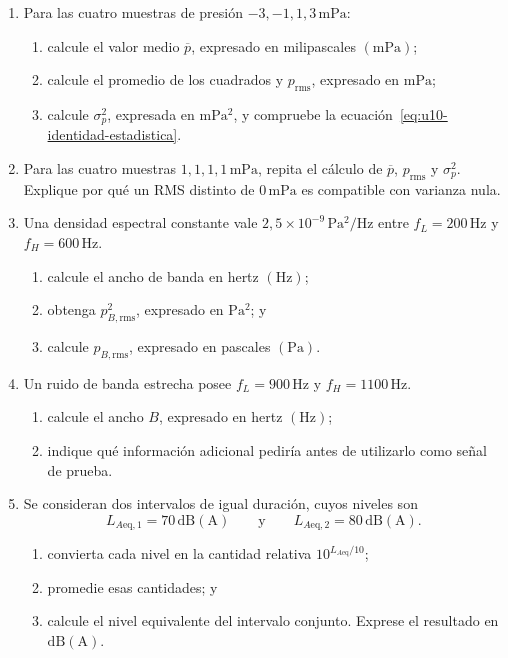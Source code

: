 \begin{enumerate}[label=\textbf{G\arabic*.},leftmargin=*]
    \item Para las cuatro muestras de presión
    \(-3,-1,1,3\,\mathrm{mPa}\):
    \begin{enumerate}
        \item calcule el valor medio \(\overline p\), expresado en
        milipascales \((\mathrm{mPa})\);
        \item calcule el promedio de los cuadrados y
        \(p_{\mathrm{rms}}\), expresado en \(\mathrm{mPa}\);
        \item calcule \(\sigma_p^2\), expresada en
        \(\mathrm{mPa^2}\), y compruebe la
        ecuación~\eqref{eq:u10-identidad-estadistica}.
    \end{enumerate}

    \item Para las cuatro muestras
    \(1,1,1,1\,\mathrm{mPa}\), repita el cálculo de
    \(\overline p\), \(p_{\mathrm{rms}}\) y \(\sigma_p^2\). Explique por qué
    un RMS distinto de \(0\,\mathrm{mPa}\) es compatible con varianza nula.

    \item Una densidad espectral constante vale
    \(2{,}5\times10^{-9}\,\mathrm{Pa^2/Hz}\) entre
    \(f_L=200\,\mathrm{Hz}\) y \(f_H=600\,\mathrm{Hz}\).
    \begin{enumerate}
        \item calcule el ancho de banda en hertz \((\mathrm{Hz})\);
        \item obtenga \(p_{B,\mathrm{rms}}^2\), expresado en
        \(\mathrm{Pa^2}\); y
        \item calcule \(p_{B,\mathrm{rms}}\), expresado en pascales
        \((\mathrm{Pa})\).
    \end{enumerate}

    \item Un ruido de banda estrecha posee
    \(f_L=900\,\mathrm{Hz}\) y \(f_H=1100\,\mathrm{Hz}\).
    \begin{enumerate}
        \item calcule el ancho \(B\), expresado en hertz \((\mathrm{Hz})\);
        \item indique qué información adicional pediría antes de utilizarlo
        como señal de prueba.
    \end{enumerate}

    \item Se consideran dos intervalos de igual duración, cuyos niveles son
    \[
        L_{A\mathrm{eq},1}=70\,\mathrm{dB(A)}
        \qquad\text{y}\qquad
        L_{A\mathrm{eq},2}=80\,\mathrm{dB(A)}.
    \]
    \begin{enumerate}
        \item convierta cada nivel en la cantidad relativa
        \(10^{L_{A\mathrm{eq}}/10}\);
        \item promedie esas cantidades; y
        \item calcule el nivel equivalente del intervalo conjunto. Exprese el
        resultado en \(\mathrm{dB(A)}\).
    \end{enumerate}
\end{enumerate}

